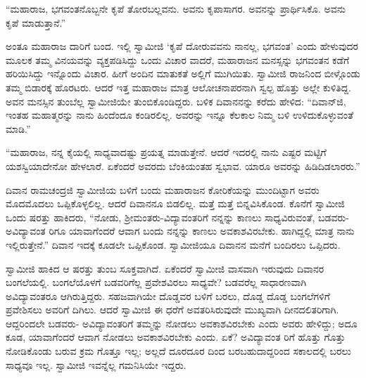 “ಮಹಾರಾಜ, ಭಗವಂತನೊಬ್ಬನೇ ಕೃಪೆ ತೋರಬಲ್ಲವನು. ಅವನು ಕೃಪಾಸಾಗರ. ಅವನನ್ನು ಪ್ರಾರ್ಥಿಸಿಕೊ. ಅವನು ಕೃಪೆ ಮಾಡುತ್ತಾನೆ.”

ಅಂತೂ ಮಹಾರಾಜ ದಾರಿಗೆ ಬಂದ. ಇಲ್ಲಿ ಸ್ವಾಮೀಜಿ ‘ಕೃಪೆ ದೋರುವವನು ನಾನಲ್ಲ, ಭಗವಂತ’ ಎಂದು ಹೇಳುವುದರ ಮೂಲಕ ತಮ್ಮ ವಿನಯವನ್ನು ವ್ಯಕ್ತಪಡಿಸಿದ್ದು ಒಂದು ವಿಚಾರ ವಾದರೆ, ಮಹಾರಾಜನ ಮನಸ್ಸನ್ನು ಭಗವಂತನ ಕಡೆಗೆ ಹರಿಯಿಸಿದ್ದು ಇನ್ನೊಂದು ವಿಚಾರ. ಹೀಗೆ ಅಂದಿನ ಮಾತುಕತೆ ಅಲ್ಲಿಗೆ ಮುಗಿಯಿತು. ಸ್ವಾಮೀಜಿ ರಾಜನಿಂದ ಬೀಳ್ಗೊಂಡು ತಮ್ಮ ಬಿಡಾರಕ್ಕೆ ಹೊರಟರು. ಆದರೆ ಇತ್ತ ಮಹಾರಾಜ ಮಾತ್ರ ಆಲೋಚನಾಪರನಾಗಿ ಸ್ವಲ್ಪ ಹೊತ್ತು ಅಲ್ಲೇ ಕುಳಿತಿದ್ದ. ಅವನ ಮನಸ್ಸಿನ ತುಂಬೆಲ್ಲ ಸ್ವಾಮೀಜಿಯೇ ತುಂಬಿಕೊಂಡಿದ್ದರು. ಬಳಿಕ ದಿವಾನನನ್ನು ಕರೆದು ಹೇಳಿದ: “ದಿವಾನ್​ಜಿ, ಇಂತಹ ಮಹಾತ್ಮರನ್ನು ನಾನು ಹಿಂದೆಂದೂ ಕಂಡಿರಲಿಲ್ಲ. ಅವರನ್ನು ಇನ್ನೂ ಕೆಲಕಾಲ ನಿಮ್ಮ ಬಳಿ ಉಳಿದುಕೊಳ್ಳುವಂತೆ ಮಾಡಿ.”

“ಮಹಾರಾಜ, ನನ್ನ ಕೈಯಲ್ಲಿ ಸಾಧ್ಯವಾದಷ್ಟು ಪ್ರಯತ್ನ ಮಾಡುತ್ತೇನೆ. ಆದರೆ ಇದರಲ್ಲಿ ನಾನು ಎಷ್ಟರ ಮಟ್ಟಿಗೆ ಯಶಸ್ವಿಯಾದೇನೋ ಹೇಳಲಾರೆ. ಏಕೆಂದರೆ ಅವರದು ಬೆಂಕಿಯಂತಹ ಸ್ವಭಾವ. ಯಾರೂ ಅವರನ್ನು ಹಿಡಿದಿಡಲಾರರು.”

ದಿವಾನ ರಾಮಚಂದ್ರಜಿ ಸ್ವಾಮೀಜಿಯ ಬಳಿಗೆ ಬಂದು ಮಹಾರಾಜನ ಕೋರಿಕೆಯನ್ನು ಮುಂದಿಟ್ಟಾಗ ಅವರು ಮೊದಮೊದಲು ಒಪ್ಪಿಕೊಳ್ಳಲಿಲ್ಲ. ಆದರೆ ದಿವಾನನೂ ಬಿಡಲಿಲ್ಲ. ಮತ್ತೆ ಮತ್ತೆ ಬಿನ್ನವಿಸಿಕೊಂಡ. ಕೊನೆಗೆ ಸ್ವಾಮೀಜಿ ಒಂದು ಷರತ್ತು ಹಾಕಿದರು, “ನೋಡು, ಶ್ರೀಮಂತರು-ವಿದ್ಯಾವಂತರಿಗೆ ನನ್ನನ್ನು ಕಾಣಲು ಸಾಧ್ಯವಿರುವಂತೆ, ಬಡವರು-ಅವಿದ್ಯಾವಂತ ರಿಗೂ ಯಾವಾಗೆಂದರೆ ಆವಾಗ ಬಂದು ನನ್ನನ್ನು ಕಾಣಲು ಅವಕಾಶವಿರಬೇಕು. ಹಾಗಿದ್ದಲ್ಲಿ ಮಾತ್ರ ನಾನು ಇಲ್ಲಿರುತ್ತೇನೆ.” ದಿವಾನ ಇದಕ್ಕೆ ಕೂಡಲೇ ಒಪ್ಪಿಕೊಂಡ. ಸ್ವಾಮೀಜಿಯೂ ದಿವಾನನ ಮನೆಗೆ ಬಂದಿರಲು ಒಪ್ಪಿದರು.

ಸ್ವಾಮೀಜಿ ಹಾಕಿದ ಆ ಷರತ್ತು ತುಂಬ ಸೂಕ್ತವಾಗಿದೆ. ಏಕೆಂದರೆ ಸ್ವಾಮೀಜಿ ವಾಸವಾಗಿ ಇರುವುದು ದಿವಾನರ ಬಂಗಲೆಯಲ್ಲಿ. ಬಂಗಲೆಯೊಳಗೆ ಬಡವರಿಗೆಲ್ಲ ಪ್ರವೇಶವಿರಲು ಸಾಧ್ಯವೇ? ಬಡವರೆಲ್ಲ ಸಾಧಾರಣವಾಗಿ ಅವಿದ್ಯಾವಂತರೂ ಆಗಿರುತ್ತಿದ್ದರು. ಸಹಜವಾಗಿಯೇ ದೊಡ್ಡವರ ಬಳಿಗೆ ಬರಲು, ದೊಡ್ಡ ದೊಡ್ಡ ಬಂಗಲೆಗಳಿಗೆ ಪ್ರವೇಶಿಸಲು ಅವರಿಗೆ ದಿಗಿಲು. ಆದರೆ ಸ್ವಾಮೀಜಿ ಈ ಧರೆಗೆ ಅವತರಿಸಿರುವುದೇ ಮುಖ್ಯವಾಗಿ ದೀನದಲಿತರಿಗಾಗಿ. ಆದ್ದರಿಂದಲೇ ಬಡವರು- ಅವಿದ್ಯಾವಂತರಿಗೆ ತಮ್ಮನ್ನು ನೋಡಲು ಅವಕಾಶವಿರಬೇಕು ಎಂದು ಅವರು ಹೇಳಿದ್ದು; ಅದೂ ಕೂಡ, ಯಾವಾಗೆಂದರೆ ಆವಾಗ ನೋಡಲು ಅವಕಾಶವಿರಬೇಕು ಎಂದು. ಏಕೆ? ಅವಿದ್ಯಾವಂತ ರಿಗೆ ಹೊತ್ತು ಗೊತ್ತು ನೋಡಿಕೊಂಡು ಬರುವ ಕ್ರಮ ಗೊತ್ತೂ ಇಲ್ಲ; ಅಲ್ಲದೆ ದೂರದೂರ ದಿಂದ ಬರಬಹುದಾದ್ದರಿಂದ ಸಕಾಲದಲ್ಲಿ ಬರಲು ಸಾಧ್ಯವೂ ಇಲ್ಲ. ಸ್ವಾಮೀಜಿ ಇವನ್ನೆಲ್ಲ ಗಮನಿಸಿಯೇ ಇದ್ದರು.

